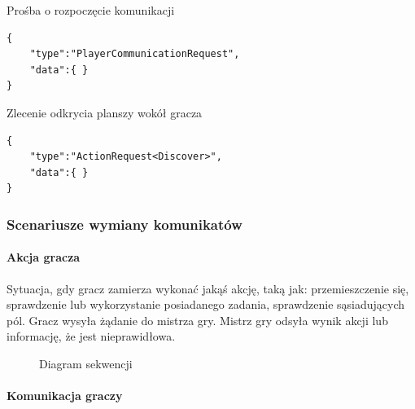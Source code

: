 \documentclass[11pt]{article}
\let\Oldsubsubsection\subsubsection
\renewcommand{\subsubsection}{\FloatBarrier\Oldsubsubsection}
\begin{document}
\begin{json}
\caption{Prośba o rozpoczęcie komunikacji}
\begin{lstlisting}
{ 
	"type":"PlayerCommunicationRequest",
	"data":{ }
}
\end{lstlisting}
\end{json}

\begin{json}
\caption{Zlecenie odkrycia planszy wokół gracza}
\begin{lstlisting}
{ 
	"type":"ActionRequest<Discover>",
	"data":{ }
}
\end{lstlisting}
\end{json}

\subsubsection{Scenariusze wymiany komunikatów}

\paragraph{Akcja gracza}

Sytuacja, gdy gracz zamierza wykonać jakąś akcję, taką jak: przemieszczenie się, sprawdzenie lub wykorzystanie posiadanego zadania, sprawdzenie sąsiadujących pól.
Gracz wysyła żądanie do mistrza gry. Mistrz gry odsyła wynik akcji lub informację, że jest nieprawidłowa.

\begin{figure}[!h]
	\centering
	\caption{Diagram sekwencji}
		\hspace*{-2cm}
\end{figure}
\FloatBarrier

\paragraph{Komunikacja graczy}
\end{document}
